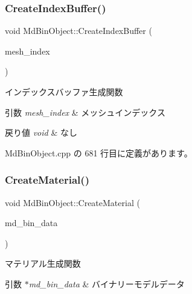 \subsubsection{\texorpdfstring{Create\+Index\+Buffer()}{CreateIndexBuffer()}}
{\footnotesize\ttfamily void Md\+Bin\+Object\+::\+Create\+Index\+Buffer (\begin{DoxyParamCaption}\item[{int}]{mesh\+\_\+index }\end{DoxyParamCaption})\hspace{0.3cm}{\ttfamily [private]}}



インデックスバッファ生成関数 


\begin{DoxyParams}{引数}
{\em mesh\+\_\+index} & メッシュインデックス \\
\hline
\end{DoxyParams}

\begin{DoxyRetVals}{戻り値}
{\em void} & なし \\
\hline
\end{DoxyRetVals}


 Md\+Bin\+Object.\+cpp の 681 行目に定義があります。

\mbox{\label{class_md_bin_object_aebdcf221ed6ebc7bd29fc84b808cb685}} 
\subsubsection{\texorpdfstring{Create\+Material()}{CreateMaterial()}}
{\footnotesize\ttfamily void Md\+Bin\+Object\+::\+Create\+Material (\begin{DoxyParamCaption}\item[{\mbox{\hyperlink{class_md_bin_data}{Md\+Bin\+Data}} $\ast$}]{md\+\_\+bin\+\_\+data }\end{DoxyParamCaption})\hspace{0.3cm}{\ttfamily [private]}}



マテリアル生成関数 


\begin{DoxyParams}{引数}
{\em $\ast$md\+\_\+bin\+\_\+data} & バイナリーモデルデータ \\
\hline
\end{DoxyParams}

